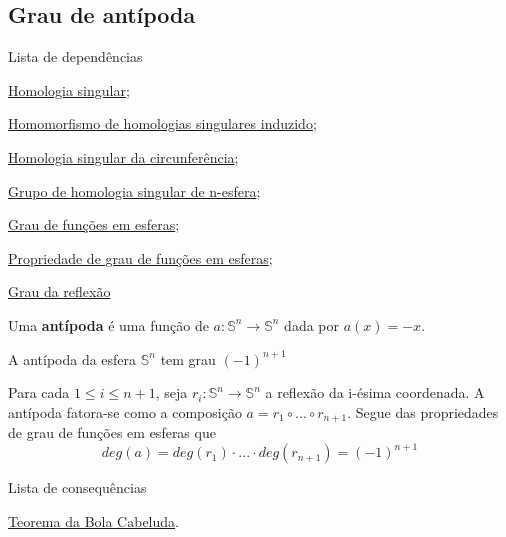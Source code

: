 \subsection{Grau de antípoda} %
\label{grau-de-antipoda-prop}
\begin{titlemize}{Lista de dependências}
    \item \hyperref[homologia-singular-def]{Homologia singular};\\
    \item \hyperref[homomorfismo-de-homologias-singulares-induzido-prop]{Homomorfismo de homologias singulares induzido};\\
    \item \hyperref[homologia-singular-de-S1-prop]{Homologia singular da circunferência};\\
    \item \hyperref[grupo-de-homologia-singular-de-n-esfera-prop]{Grupo de homologia singular de n-esfera};\\
    \item \hyperref[grau-de-funcoes-em-esferas-def]{Grau de funções em esferas};\\
    \item \hyperref[propriedades-de-grau-de-funções-prop]{Propriedade de grau de funções em esferas};\\
    \item \hyperref[grau-da-reflexao-prop]{Grau da reflexão}
\end{titlemize}

\begin{defi}
    Uma \textbf{antípoda} é uma função de $a:\mathbb{S}^n\rightarrow \mathbb{S}^n$ dada por $a(x)=-x$.
\end{defi}

\begin{lemma}
    A antípoda da esfera $\mathbb{S}^n$ tem grau $(-1)^{n+1}$
\end{lemma}

\begin{dem}
    Para cada $1\le i\le n+1$, seja $r_i: \mathbb{S}^n\rightarrow \mathbb{S}^n$ a reflexão da i-ésima coordenada. A antípoda fatora-se como a composição $a=r_1\circ ...\circ r_{n+1}$. Segue das propriedades de grau de funções em esferas que 
    \[deg(a)=deg(r_1)\cdot...\cdot deg(r_{n+1})=(-1)^{n+1}\]
\end{dem}

\begin{titlemize}{Lista de consequências}
    \item \hyperref[]{Teorema da Bola Cabeluda}.\\
\end{titlemize}
